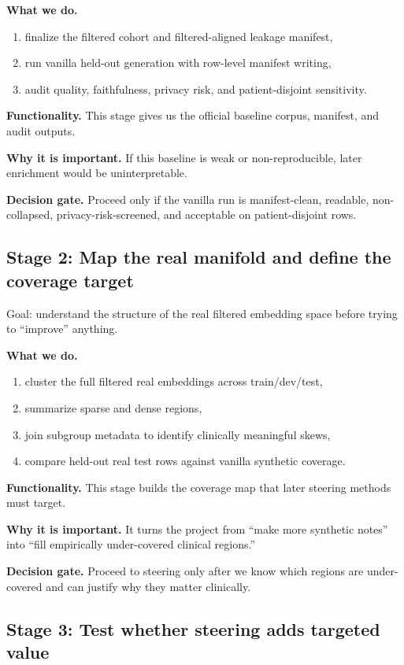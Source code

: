 \documentclass[11pt]{article}
\begin{document}
\textbf{What we do.}
\begin{enumerate}[nosep]
  \item finalize the filtered cohort and filtered-aligned leakage manifest,
  \item run vanilla held-out generation with row-level manifest writing,
  \item audit quality, faithfulness, privacy risk, and patient-disjoint sensitivity.
\end{enumerate}

\textbf{Functionality.}
This stage gives us the official baseline corpus, manifest, and audit outputs.

\textbf{Why it is important.}
If this baseline is weak or non-reproducible, later enrichment would be uninterpretable.

\textbf{Decision gate.}
Proceed only if the vanilla run is manifest-clean, readable, non-collapsed, privacy-risk-screened, and acceptable on patient-disjoint rows.

\subsection{Stage 2: Map the real manifold and define the coverage target}

Goal: understand the structure of the real filtered embedding space before trying to ``improve'' anything.

\textbf{What we do.}
\begin{enumerate}[nosep]
  \item cluster the full filtered real embeddings across train/dev/test,
  \item summarize sparse and dense regions,
  \item join subgroup metadata to identify clinically meaningful skews,
  \item compare held-out real test rows against vanilla synthetic coverage.
\end{enumerate}

\textbf{Functionality.}
This stage builds the coverage map that later steering methods must target.

\textbf{Why it is important.}
It turns the project from ``make more synthetic notes'' into ``fill empirically under-covered clinical regions.''

\textbf{Decision gate.}
Proceed to steering only after we know which regions are under-covered and can justify why they matter clinically.

\subsection{Stage 3: Test whether steering adds targeted value}
\end{document}

